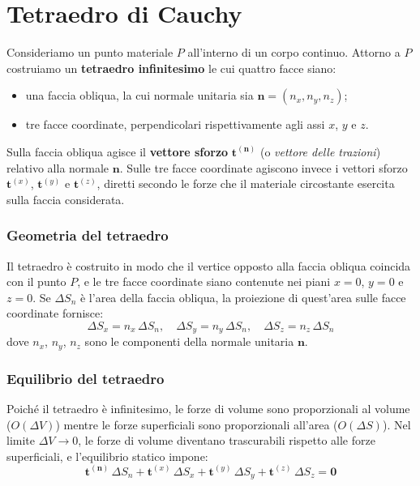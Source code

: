 
\section{Tetraedro di Cauchy}
Consideriamo un punto materiale $P$ all’interno di un corpo continuo. Attorno a $P$ costruiamo un \textbf{tetraedro infinitesimo} le cui quattro facce siano:
\begin{itemize}
    \item una faccia obliqua, la cui normale unitaria sia $\mathbf{n} = (n_x, n_y, n_z)$;
    \item tre facce coordinate, perpendicolari rispettivamente agli assi $x$, $y$ e $z$.
\end{itemize}

Sulla faccia obliqua agisce il \textbf{vettore sforzo} $\mathbf{t}^{(\mathbf{n})}$ (o \textit{vettore delle trazioni}) relativo alla normale $\mathbf{n}$.  
Sulle tre facce coordinate agiscono invece i vettori sforzo $\mathbf{t}^{(x)}$, $\mathbf{t}^{(y)}$ e $\mathbf{t}^{(z)}$, diretti secondo le forze che il materiale circostante esercita sulla faccia considerata.

\subsubsection*{Geometria del tetraedro}
Il tetraedro è costruito in modo che il vertice opposto alla faccia obliqua coincida con il punto $P$, e le tre facce coordinate siano contenute nei piani $x = 0$, $y = 0$ e $z = 0$.  
Se $\Delta S_n$ è l’area della faccia obliqua, la proiezione di quest’area sulle facce coordinate fornisce:
\begin{equation*}
\Delta S_x = n_x \, \Delta S_n, \quad
\Delta S_y = n_y \, \Delta S_n, \quad
\Delta S_z = n_z \, \Delta S_n
\end{equation*}
dove $n_x$, $n_y$, $n_z$ sono le componenti della normale unitaria $\mathbf{n}$.

\subsubsection*{Equilibrio del tetraedro}
Poiché il tetraedro è infinitesimo, le forze di volume sono proporzionali al volume ($O(\Delta V)$) mentre le forze superficiali sono proporzionali all’area ($O(\Delta S)$). Nel limite $\Delta V \to 0$, le forze di volume diventano trascurabili rispetto alle forze superficiali, e l’equilibrio statico impone:
\begin{equation*}
\mathbf{t}^{(\mathbf{n})} \, \Delta S_n + \mathbf{t}^{(x)} \, \Delta S_x + \mathbf{t}^{(y)} \, \Delta S_y + \mathbf{t}^{(z)} \, \Delta S_z = \mathbf{0}
\end{equation*}

